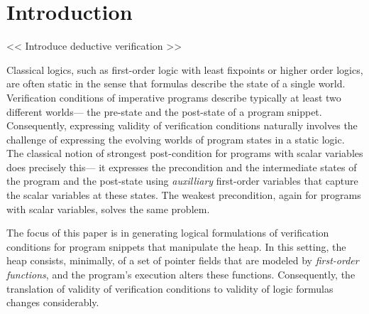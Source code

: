 \section{Introduction}
\label{sec:intro}




<< Introduce deductive verification >>

Classical logics, such as first-order logic with least fixpoints or higher order logics, are often static in the sense that formulas 
describe the state of a single world. 
Verification conditions of imperative programs describe typically at least two different worlds--- the pre-state
and the post-state of a program snippet. Consequently, expressing validity of verification conditions
naturally involves the challenge of expressing the evolving worlds of program states in a static logic.
The classical notion of strongest post-condition for programs with scalar variables does precisely this--- 
it expresses the precondition and the intermediate states of the program and the post-state using \emph{auxilliary} 
first-order variables that capture the scalar variables at these states. The weakest precondition, again for
programs with scalar variables, solves the same problem.

The focus of this paper is in generating logical formulations of verification conditions for program snippets that manipulate the heap.
In this setting, the heap consists, minimally, of a set of pointer fields that are modeled by \emph{first-order
functions}, and the program's execution alters these functions.
Consequently, the translation of validity of verification conditions to validity of logic formulas changes considerably.

